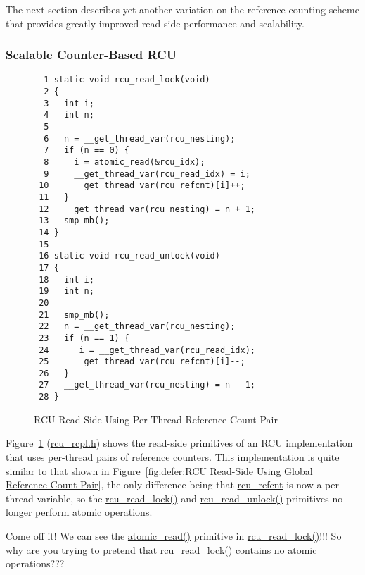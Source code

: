 The next section describes yet another variation on the reference-counting
scheme that provides greatly improved read-side performance and scalability.

\subsubsection{Scalable Counter-Based RCU}
\label{defer:Scalable Counter-Based RCU}

\begin{figure}[tbp]
{ \scriptsize
\begin{verbatim}
  1 static void rcu_read_lock(void)
  2 {
  3   int i;
  4   int n;
  5
  6   n = __get_thread_var(rcu_nesting);
  7   if (n == 0) {
  8     i = atomic_read(&rcu_idx);
  9     __get_thread_var(rcu_read_idx) = i;
 10     __get_thread_var(rcu_refcnt)[i]++;
 11   }
 12   __get_thread_var(rcu_nesting) = n + 1;
 13   smp_mb();
 14 }
 15
 16 static void rcu_read_unlock(void)
 17 {
 18   int i;
 19   int n;
 20
 21   smp_mb();
 22   n = __get_thread_var(rcu_nesting);
 23   if (n == 1) {
 24      i = __get_thread_var(rcu_read_idx);
 25     __get_thread_var(rcu_refcnt)[i]--;
 26   }
 27   __get_thread_var(rcu_nesting) = n - 1;
 28 }
\end{verbatim}
}
\caption{RCU Read-Side Using Per-Thread Reference-Count Pair}
\label{fig:defer:RCU Read-Side Using Per-Thread Reference-Count Pair}
\end{figure}

Figure~\ref{fig:defer:RCU Read-Side Using Per-Thread Reference-Count Pair}
(\url{rcu_rcpl.h})
shows the read-side primitives of an RCU implementation that uses per-thread
pairs of reference counters.
This implementation is quite similar to that shown in
Figure~\ref{fig:defer:RCU Read-Side Using Global Reference-Count Pair},
the only difference being that \url{rcu_refcnt} is now a per-thread
variable, so the \url{rcu_read_lock()} and
\url{rcu_read_unlock()} primitives no longer perform atomic operations.

\QuickQuiz{}
	Come off it!
	We can see the \url{atomic_read()} primitive in
	\url{rcu_read_lock()}!!!
	So why are you trying to pretend that \url{rcu_read_lock()}
	contains no atomic operations???
 \QuickQuizEnd


